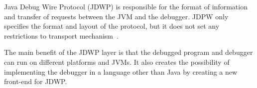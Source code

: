 \documentclass[..thesis.tex]{subfiles}
\begin{document}
Java Debug Wire Protocol (JDWP) is responsible for the format of information and transfer of requests between the JVM and the debugger.
JDPW only specifies the format and layout of the protocol, but it does not set any restrictions to transport mechanism~\cite{oracle_jpda_jdwp}.

The main benefit of the JDWP layer is that the debugged program and debugger can run on different platforms and JVMs.
It also creates the possibility of implementing the debugger in a language other than Java by creating a new front-end for JDWP.
\end{document}
